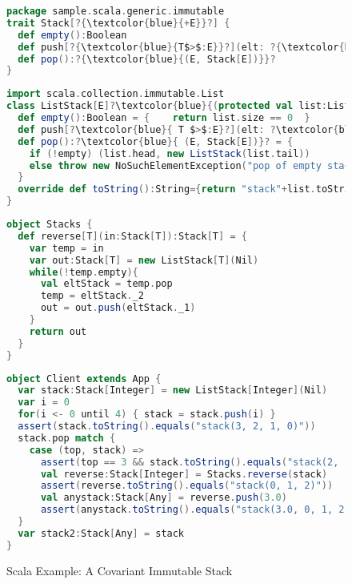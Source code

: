   \begin{figure}[p]
  \begin{lstlisting}[language=scala, escapechar=?]
package sample.scala.generic.immutable  
trait Stack[?{\textcolor{blue}{+E}}?] {
  def empty():Boolean
  def push[?{\textcolor{blue}{T$>$:E}}?](elt: ?{\textcolor{blue}{T}}?): ?\textcolor{blue}{Stack[T]}?
  def pop():?{\textcolor{blue}{(E, Stack[E])}}?
}
  \end{lstlisting}

  \begin{lstlisting}[language=scala, escapechar=?]
import scala.collection.immutable.List
class ListStack[E]?\textcolor{blue}{(protected val list:List[E])}? extends Stack[E]{  
  def empty():Boolean = {    return list.size == 0  }
  def push[?\textcolor{blue}{ T $>$:E}?](elt: ?\textcolor{blue}{ T}?): ?\textcolor{blue}{ Stack[T]}? = {  new ListStack(elt :: list)  }
  def pop():?\textcolor{blue}{ (E, Stack[E])}? = {
    if (!empty) (list.head, new ListStack(list.tail))
    else throw new NoSuchElementException("pop of empty stack")
  }
  override def toString():String={return "stack"+list.toString.drop(4)}
}
  \end{lstlisting}
  
  \begin{lstlisting}[language=scala]
object Stacks {
  def reverse[T](in:Stack[T]):Stack[T] = {
    var temp = in
    var out:Stack[T] = new ListStack[T](Nil)
    while(!temp.empty){
      val eltStack = temp.pop
      temp = eltStack._2
      out = out.push(eltStack._1)
    }
    return out
  }
}
  \end{lstlisting}

  \begin{lstlisting}[language=scala, escapechar=?]
object Client extends App {
  var stack:Stack[Integer] = new ListStack[Integer](Nil)  
  var i = 0
  for(i <- 0 until 4) { stack = stack.push(i) }
  assert(stack.toString().equals("stack(3, 2, 1, 0)"))
  stack.pop match {
    case (top, stack) =>
      assert(top == 3 && stack.toString().equals("stack(2, 1, 0)"))
      val reverse:Stack[Integer] = Stacks.reverse(stack)
      assert(reverse.toString().equals("stack(0, 1, 2)"))      
      val anystack:Stack[Any] = reverse.push(3.0)
      assert(anystack.toString().equals("stack(3.0, 0, 1, 2)"))      
  }
  var stack2:Stack[Any] = stack  
}
  \end{lstlisting} 
  \caption{Scala Example: A Covariant Immutable Stack}
  \label{scala_covariance}
\end{figure}


